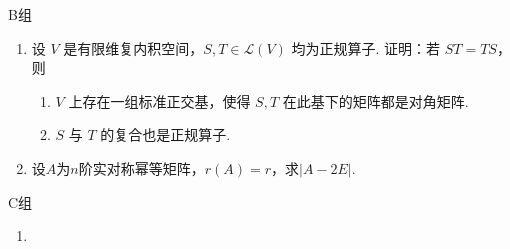 \centerline{\heiti B组}
\begin{enumerate}
    \item 设 $ V $ 是有限维复内积空间，$ S, T \in \mathcal{L}(V) $ 均为正规算子. 证明：若 $ ST = TS $，则
          \begin{enumerate}
              \item $ V $ 上存在一组标准正交基，使得 $ S, T $ 在此基下的矩阵都是对角矩阵.

              \item $ S $ 与 $ T $ 的复合也是正规算子.
          \end{enumerate}

    \item 设$A$为$n$阶实对称幂等矩阵，$r(A)=r$，求$|A-2E|$.
\end{enumerate}

\centerline{\heiti C组}
\begin{enumerate}
    \item
\end{enumerate}
